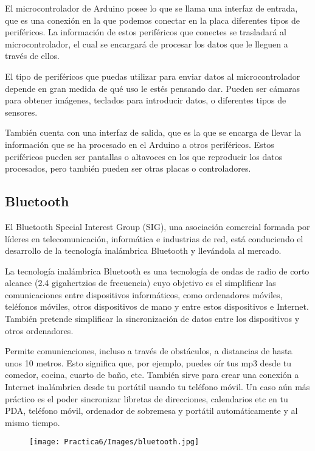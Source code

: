\documentclass[12pt]{article}
\begin{document}
        El microcontrolador de Arduino posee lo que se llama una interfaz de entrada, que es una conexión en la que podemos conectar en la placa diferentes tipos de periféricos. La información de estos periféricos que conectes se trasladará al microcontrolador, el cual se encargará de procesar los datos que le lleguen a través de ellos.
        
        El tipo de periféricos que puedas utilizar para enviar datos al microcontrolador depende en gran medida de qué uso le estés pensando dar. Pueden ser cámaras para obtener imágenes, teclados para introducir datos, o diferentes tipos de sensores.
        
        También cuenta con una interfaz de salida, que es la que se encarga de llevar la información que se ha procesado en el Arduino a otros periféricos. Estos periféricos pueden ser pantallas o altavoces en los que reproducir los datos procesados, pero también pueden ser otras placas o controladores.
        
        \subsection{Bluetooth}
        El Bluetooth Special Interest Group (SIG), una asociación comercial formada por líderes en telecomunicación, informática e industrias de red, está conduciendo el desarrollo de la tecnología inalámbrica Bluetooth y llevándola al mercado.

        La tecnología inalámbrica Bluetooth es una tecnología de ondas de radio de corto alcance (2.4 gigahertzios de frecuencia) cuyo objetivo es el simplificar las comunicaciones entre dispositivos informáticos, como ordenadores móviles, teléfonos móviles, otros dispositivos de mano y entre estos dispositivos e Internet. También pretende simplificar la sincronización de datos entre los dispositivos y otros ordenadores.
        
        Permite comunicaciones, incluso a través de obstáculos, a distancias de hasta unos 10 metros. Esto significa que, por ejemplo, puedes oír tus mp3 desde tu comedor, cocina, cuarto de baño, etc. También sirve para crear una conexión a Internet inalámbrica desde tu portátil usando tu teléfono móvil. Un caso aún más práctico es el poder sincronizar libretas de direcciones, calendarios etc en tu PDA, teléfono móvil, ordenador de sobremesa y portátil automáticamente y al mismo tiempo.
        
        \begin{figure}[h!]
                \centering
                \texttt{[image: Practica6/Images/bluetooth.jpg]}
            \end{figure}
    \newpage
\end{document}
